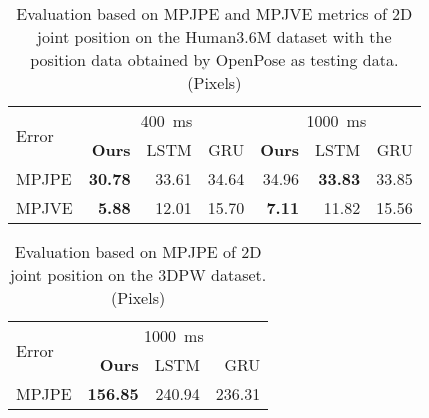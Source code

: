 
\begin{table}[!t]
    \centering
    \caption{Evaluation based on MPJPE and MPJVE metrics of 2D joint position on the Human3.6M dataset with the position data obtained by OpenPose as testing data. (Pixels)}
    \begin{tabular}{l|rrr|rrr}
        \toprule
        \multirow{2}{*}{Error} & \multicolumn{3}{c|}{\SI{400}{\milli\second}}  & \multicolumn{3}{c}{\SI{1000}{\milli\second}} \\
            & \textbf{Ours} & LSTM & GRU & \textbf{Ours} & LSTM & GRU \\
        \midrule
        MPJPE & \textbf{30.78} & 33.61 & 34.64 & 34.96 & \textbf{33.83} & 33.85 \\
        MPJVE & \textbf{5.88 }& 12.01 & 15.70 & \textbf{7.11} & 11.82 & 15.56 \\
        \bottomrule
    \end{tabular}
    \label{tbl:4_2D_OpenPose}
\end{table}

\begin{table}[!t]
    \centering
    \caption{Evaluation based on MPJPE of 2D joint position on the 3DPW dataset. (Pixels)}
    \begin{tabular}{l|rrr}
        \toprule
        \multirow{2}{*}{Error}  & \multicolumn{3}{c}{\SI{1000}{\milli\second}} \\
            & \textbf{Ours} & LSTM & GRU\\
        \midrule
        MPJPE & \textbf{156.85} & 240.94 & 236.31  \\
        \bottomrule
    \end{tabular}
    \label{tbl:4_2D_3DPW}
\end{table}



